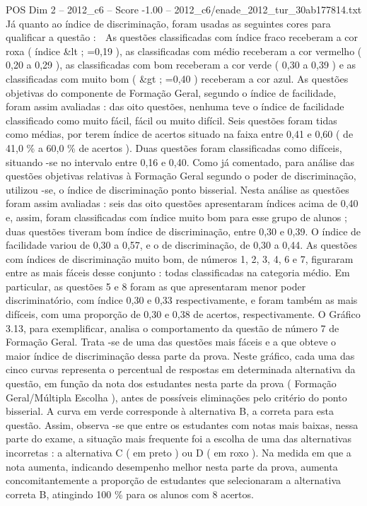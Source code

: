 \begin{textsample}{POS Dim 2 – 2012\_c6 – Score -1.00 – 2012\_c6/enade\_2012\_tur\_30ab177814.txt}
Já quanto ao índice de discriminação, foram usadas as seguintes cores para qualificar a questão :  As questões classificadas com índice fraco receberam a cor roxa ( índice \&lt ; =0,19 ), as classificadas com médio receberam a cor vermelho ( 0,20 a 0,29 ), as classificadas com bom receberam a cor verde ( 0,30 a 0,39 ) e as classificadas com muito bom ( \&gt ; =0,40 ) receberam a cor azul.
As questões objetivas do componente de Formação Geral, segundo o índice de facilidade, foram assim avaliadas : das oito questões, nenhuma teve o índice de facilidade classificado como muito fácil, fácil ou muito difícil.
Seis questões foram tidas como médias, por terem índice de acertos situado na faixa entre 0,41 e 0,60 ( de 41,0 \% a 60,0 \% de acertos ).
Duas questões foram classificadas como difíceis, situando -se no intervalo entre 0,16 e 0,40.
Como já comentado, para análise das questões objetivas relativas à Formação Geral segundo o poder de discriminação, utilizou -se, o índice de discriminação ponto bisserial.
Nesta análise as questões foram assim avaliadas : seis das oito questões apresentaram índices acima de 0,40 e, assim, foram classificadas com índice muito bom para esse grupo de alunos ; duas questões tiveram bom índice de discriminação, entre 0,30 e 0,39.
O índice de facilidade variou de 0,30 a 0,57, e o de discriminação, de 0,30 a 0,44.
As questões com índices de discriminação muito bom, de números 1, 2, 3, 4, 6 e 7, figuraram entre as mais fáceis desse conjunto : todas classificadas na categoria médio.
Em particular, as questões 5 e 8 foram as que apresentaram menor poder discriminatório, com índice 0,30 e 0,33 respectivamente, e foram também as mais difíceis, com uma proporção de 0,30 e 0,38 de acertos, respectivamente.
O Gráfico 3.13, para exemplificar, analisa o comportamento da questão de número 7 de Formação Geral.
Trata -se de uma das questões mais fáceis e a que obteve o maior índice de discriminação dessa parte da prova.
Neste gráfico, cada uma das cinco curvas representa o percentual de respostas em determinada alternativa da questão, em função da nota dos estudantes nesta parte da prova ( Formação Geral/Múltipla Escolha ), antes de possíveis eliminações pelo critério do ponto bisserial.
A curva em verde corresponde à alternativa B, a correta para esta questão.
Assim, observa -se que entre os estudantes com notas mais baixas, nessa parte do exame, a situação mais frequente foi a escolha de uma das alternativas incorretas : a alternativa C ( em preto ) ou D ( em roxo ).
Na medida em que a nota aumenta, indicando desempenho melhor nesta parte da prova, aumenta concomitantemente a proporção de estudantes que selecionaram a alternativa correta B, atingindo 100 \% para os alunos com 8 acertos.

\end{textsample}
